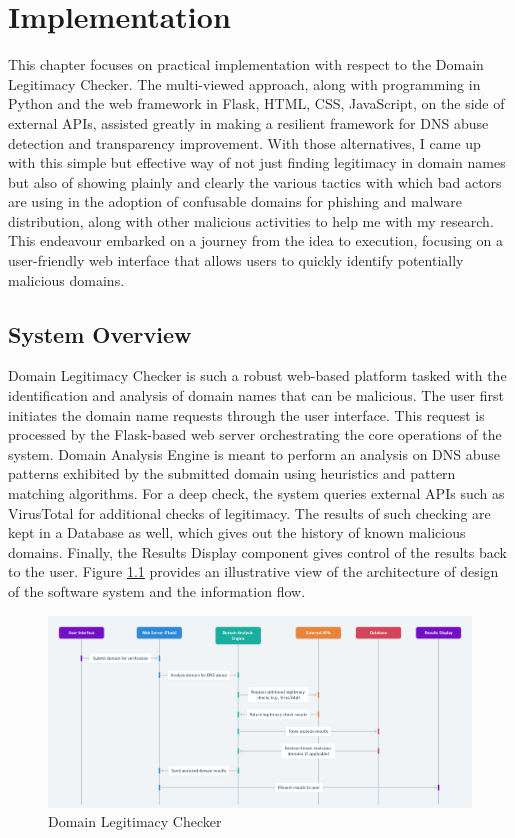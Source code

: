 \chapter{Implementation}



This chapter focuses on practical implementation with respect to the Domain Legitimacy Checker. The multi-viewed approach, along with programming in Python and the web framework in Flask, HTML, CSS, JavaScript, on the side of external APIs, assisted greatly in making a resilient framework for DNS abuse detection and transparency improvement. With those alternatives, I came up with this simple but effective way of not just finding legitimacy in domain names but also of showing plainly and clearly the various tactics with which bad actors are using in the adoption of confusable domains for phishing and malware distribution, along with other malicious activities to help me with my research. This endeavour embarked on a journey from the idea to execution, focusing on a user-friendly web interface that allows users to quickly identify potentially malicious domains. 

\section{System Overview}

Domain Legitimacy Checker is such a robust web-based platform tasked with the identification and analysis of domain names that can be malicious. The user first initiates the domain name requests through the user interface. This request is processed by the Flask-based web server orchestrating the core operations of the system. Domain Analysis Engine is meant to perform an analysis on DNS abuse patterns exhibited by the submitted domain using heuristics and pattern matching algorithms. For a deep check, the system queries external APIs such as VirusTotal for additional checks of legitimacy. The results of such checking are kept in a Database as well, which gives out the history of known malicious domains. Finally, the Results Display component gives control of the results back to the user. Figure \ref{fig:figfig} provides an illustrative view of the architecture of design of the software system and the information flow.


\begin{figure}[H]
\captionsetup{font= footnotesize}
    \centering
    \includegraphics[width=1\linewidth]{project/DNS Abuse Transparency System.png}
    \caption{Domain Legitimacy Checker}
    \label{fig:figfig}
\end{figure}

